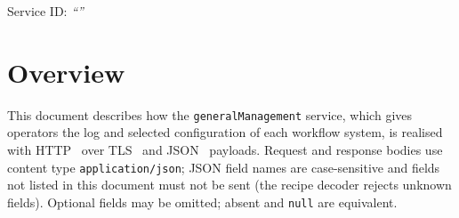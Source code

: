 \documentclass[a4paper]{arrowhead}
\begin{document}
\ArrowheadSetup

\begin{center}
  \vspace*{1cm}
  \huge{\arrowtitle}

  \vspace*{0.2cm}
  \LARGE{\arrowtype}
  \vspace*{1cm}

  \Large{Service ID: \textit{``\arrowid''}}
  \vspace*{\fill}

  

  \vspace*{1cm}
  \vspace*{\fill}

  \begin{abstract}
    This document describes the HTTP/TLS/JSON interface of the \texttt{general\allowbreak{}Management} service of the Eclipse Arrowhead workflow support systems, service version 1.0.0, documentation edition 5.4.0. It realises the abstract operations of the \texttt{general\allowbreak{}Management} SD.
  \end{abstract}

  \vspace*{1cm}
\end{center}

\newpage

\tableofcontents
\newpage

\section{Overview}
\label{sec:overview}
This document describes how the \texttt{general\allowbreak{}Management} service, which gives operators the log and selected configuration of each workflow system, is realised with HTTP~\cite{rfc9110}
over TLS~\cite{rfc8446} and JSON~\cite{rfc8259} payloads. Request and response bodies use content type
\texttt{application/\allowbreak{}json}; JSON field names are case-sensitive and fields not listed in this document must not be sent
(the recipe decoder rejects unknown fields). Optional fields may be omitted; absent and \texttt{null} are equivalent.
\end{document}
